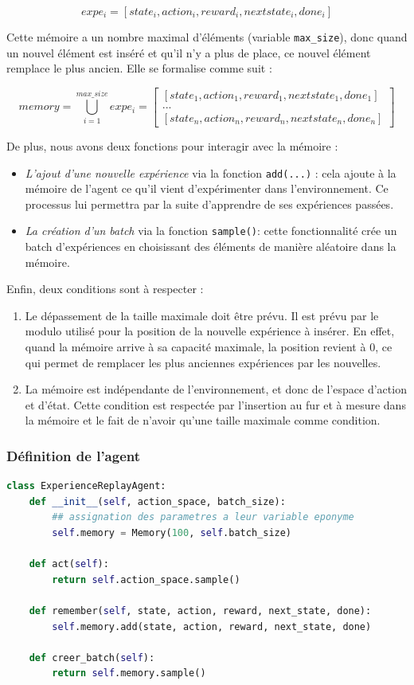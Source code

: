 \documentclass[10pt,a4paper]{article}
\begin{document}
$$
expe_i = [state_i, action_i, reward_i, nextstate_i, done_i]
$$

Cette mémoire a un nombre maximal d'éléments (variable \lstinline{max_size}), donc quand un nouvel élément est inséré et qu'il n'y a plus de place, ce nouvel élément remplace le plus ancien. Elle se formalise comme suit : 

$$
memory = \bigcup\limits_{i=1}^{max\_size} expe_{i} = 
\begin{bmatrix}
[state_1, action_1, reward_1, nextstate_1, done_1] \\
... \\
[state_n, action_n, reward_n, nextstate_n, done_n]
\end{bmatrix}
$$

De plus, nous avons deux fonctions pour interagir avec la mémoire :
\begin{itemize}
	\item \textit{L'ajout d'une nouvelle expérience} via la fonction \lstinline{add(...)} : cela ajoute à la mémoire de l'agent ce qu'il vient d'expérimenter dans l'environnement. Ce processus lui permettra par la suite d'apprendre de ses expériences passées.
	\item \textit{La création d'un batch} via la fonction \lstinline{sample()}: cette fonctionnalité crée un batch d'expériences en choisissant des éléments de manière aléatoire dans la mémoire.
\end{itemize}

Enfin, deux conditions sont à respecter :
\begin{enumerate}
	\item Le dépassement de la taille maximale doit être prévu. Il est prévu par le modulo utilisé pour la position de la nouvelle expérience à insérer. En effet, quand la mémoire arrive à sa capacité maximale, la position revient à 0, ce qui permet de remplacer les plus anciennes expériences par les nouvelles.
	\item La mémoire est indépendante de l’environnement, et donc de l’espace d’action et d’état. Cette condition est respectée par l'insertion au fur et à mesure dans la mémoire et le fait de n'avoir qu'une taille maximale comme condition.
\end{enumerate}

\subsubsection{Définition de l'agent}

\begin{lstlisting}[language=Python, caption=Implémentation de l'agent utilisant son expérience]
class ExperienceReplayAgent:
    def __init__(self, action_space, batch_size):
        ## assignation des parametres a leur variable eponyme
        self.memory = Memory(100, self.batch_size)
        
    def act(self):
        return self.action_space.sample()

    def remember(self, state, action, reward, next_state, done):
        self.memory.add(state, action, reward, next_state, done)

    def creer_batch(self):
        return self.memory.sample()
\end{lstlisting}
\end{document}
